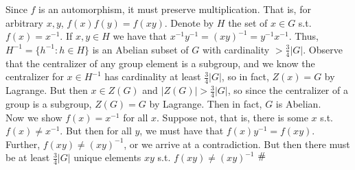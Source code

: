 \documentclass{article}
\newcommand{\contra}{\raisebox{\depth}{\#}}
\begin{document}
\section{}
Since $f$ is an automorphism, it must preserve multiplication. That is, for arbitrary $x,y$, $f(x)f(y)=f(xy)$. Denote by $H$ the set of $x \in G$ s.t. $f(x) = x^{-1}$. If $x,y \in H$ we have that $x^{-1}y^{-1} = {(xy)}^{-1} = y^{-1}x^{-1}$. Thus, $H^{-1} = \{h^{-1} : h \in H\}$ is an Abelian subset of $G$ with cardinality $> \frac{3}{4}|G|$. Observe that the centralizer of any group element is a subgroup, and we know the centralizer for $x \in H^{-1}$ has cardinality at least $\frac{3}{4}|G|$, so in fact, $Z(x) = G$ by Lagrange. But then $x \in Z(G)$ and $|Z(G)| > \frac{3}{4}|G|$, so since the centralizer of a group is a subgroup, $Z(G) = G$ by Lagrange. Then in fact, $G$ is Abelian.\\
Now we show $f(x) = x^{-1}$ for all $x$. Suppose not, that is, there is some $x$ s.t. $f(x) \neq x^{-1}$. But then for all $y$, we must have that $f(x)y^{-1} = f(xy)$. Further, $f(xy) \neq {(xy)}^{-1}$, or we arrive at a contradiction. But then there must be at least $\frac{3}{4}|G|$ unique elements $xy$ s.t. $f(xy) \neq {(xy)}^{-1}$ $\contra$
\end{document}
